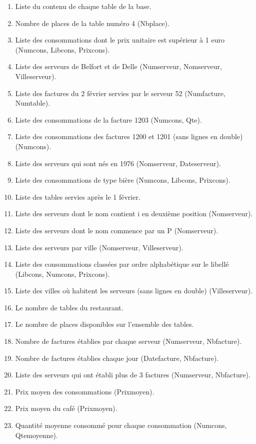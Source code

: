 \documentclass{report}
\begin{document}
\begin{enumerate}
	\item Liste du contenu de chaque table de la base.
	\item Nombre de places de la table numéro 4 (Nbplace).
	\item Liste des consommations dont le prix unitaire est supérieur à 1 euro (Numcons, Libcons, Prixcons).
	\item Liste des serveurs de Belfort et de Delle (Numserveur, Nomserveur, Villeserveur).
	\item Liste des factures du 2 février servies par le serveur 52 (Numfacture, Numtable).
	\item Liste des consommations de la facture 1203 (Numcons, Qte).
	\item Liste des consommations des factures 1200 et 1201 (sans lignes en double) (Numcons).
	\item Liste des serveurs qui sont nés en 1976 (Nomserveur, Dateserveur).
	\item Liste des consommations de type bière (Numcons, Libcons, Prixcons).
	\item Liste des tables servies après le 1 février.
	\item Liste des serveurs dont le nom contient i en deuxième position (Nomserveur).
	\item Liste des serveurs dont le nom commence par un P (Nomserveur).
	\item Liste des serveurs par ville (Nomserveur, Villeserveur).
	\item Liste des consommations classées par ordre alphabétique sur le libellé (Libcons, Numcons, Prixcons).
	\item Liste des villes où habitent les serveurs (sans lignes en double) (Villeserveur).
	\item Le nombre de tables du restaurant.
	\item Le nombre de places disponibles sur l'ensemble des tables.
	\item Nombre de factures établies par chaque serveur (Numserveur, Nbfacture).
	\item Nombre de factures établies chaque jour (Datefacture, Nbfacture).
	\item Liste des serveurs qui ont établi plus de 3 factures (Numserveur, Nbfacture).
	\item Prix moyen des consommations (Prixmoyen).
	\item Prix moyen du café (Prixmoyen).
	\item Quantité moyenne consommé pour chaque consommation (Numcons, Qtemoyenne).

\end{enumerate}
\end{document}
